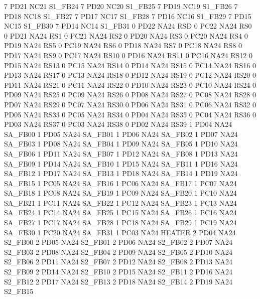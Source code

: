 7   PD21    NC21    S1_FB24
7   PD20    NC20    S1_FB25
7   PD19    NC19    S1_FB26
7   PD18    NC18    S1_FB27
7   PD17    NC17    S1_FB28
7   PD16    NC16    S1_FB29
7   PD15    NC15    S1_FB30
7   PD14    NC14    S1_FB31
0   PD22    NA24    RSD
0   PC22    NA24    RS0
0   PD21    NA24    RS1
0   PC21    NA24    RS2
0   PD20    NA24    RS3
0   PC20    NA24    RS4
0   PD19    NA24    RS5
0   PC19    NA24    RS6
0   PD18    NA24    RS7
0   PC18    NA24    RS8
0   PD17    NA24    RS9
0   PC17    NA24    RS10
0   PD16    NA24    RS11
0   PC16    NA24    RS12
0   PD15    NA24    RS13
0   PC15    NA24    RS14
0   PD14    NA24    RS15
0   PC14    NA24    RS16
0   PD13    NA24    RS17
0   PC13    NA24    RS18
0   PD12    NA24    RS19
0   PC12    NA24    RS20
0   PD11    NA24    RS21
0   PC11    NA24    RS22
0   PD10    NA24    RS23
0   PC10    NA24    RS24
0   PD09    NA24    RS25
0   PC09    NA24    RS26
0   PD08    NA24    RS27
0   PC08    NA24    RS28
0   PD07    NA24    RS29
0   PC07    NA24    RS30
0   PD06    NA24    RS31
0   PC06    NA24    RS32
0   PD05    NA24    RS33
0   PC05    NA24    RS34
0   PD04    NA24    RS35
0   PC04    NA24    RS36
0   PD03    NA24    RS37
0   PC03    NA24    RS38
0   PD02    NA24    RS39
1   PD04    NA24    SA_FB00
1   PD05    NA24    SA_FB01
1   PD06    NA24    SA_FB02
1   PD07    NA24    SA_FB03
1   PD08    NA24    SA_FB04
1   PD09    NA24    SA_FB05
1   PD10    NA24    SA_FB06
1   PD11    NA24    SA_FB07
1   PD12    NA24    SA_FB08
1   PD13    NA24    SA_FB09
1   PD14    NA24    SA_FB10
1   PD15    NA24    SA_FB11
1   PD16    NA24    SA_FB12
1   PD17    NA24    SA_FB13
1   PD18    NA24    SA_FB14
1   PD19    NA24    SA_FB15
1   PC05    NA24    SA_FB16
1   PC06    NA24    SA_FB17
1   PC07    NA24    SA_FB18
1   PC08    NA24    SA_FB19
1   PC09    NA24    SA_FB20
1   PC10    NA24    SA_FB21
1   PC11    NA24    SA_FB22
1   PC12    NA24    SA_FB23
1   PC13    NA24    SA_FB24
1   PC14    NA24    SA_FB25
1   PC15    NA24    SA_FB26
1   PC16    NA24    SA_FB27
1   PC17    NA24    SA_FB28
1   PC18    NA24    SA_FB29
1   PC19    NA24    SA_FB30
1   PC20    NA24    SA_FB31
1   PC03    NA24    HEATER
2   PD04    NA24    S2_FB00
2   PD05    NA24    S2_FB01
2   PD06    NA24    S2_FB02
2   PD07    NA24    S2_FB03
2   PD08    NA24    S2_FB04
2   PD09    NA24    S2_FB05
2   PD10    NA24    S2_FB06
2   PD11    NA24    S2_FB07
2   PD12    NA24    S2_FB08
2   PD13    NA24    S2_FB09
2   PD14    NA24    S2_FB10
2   PD15    NA24    S2_FB11
2   PD16    NA24    S2_FB12
2   PD17    NA24    S2_FB13
2   PD18    NA24    S2_FB14
2   PD19    NA24    S2_FB15
